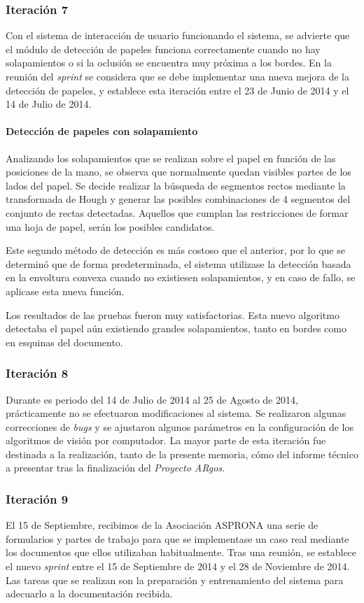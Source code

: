 \subsubsection{Iteración 7}
Con el sistema de interacción de usuario funcionando el sistema, se advierte que el módulo de detección de papeles funciona correctamente cuando no hay solapamientos o si la oclusión se encuentra muy próxima a los bordes. En la reunión del \textit{sprint} se considera que se debe implementar una nueva mejora de la detección de papeles, y establece esta iteración entre el 23 de Junio de 2014 y el 14 de Julio de 2014.

\paragraph{Detección de papeles con solapamiento}
Analizando los solapamientos que se realizan sobre el papel en función de las posiciones de la mano, se observa que normalmente quedan visibles partes de los lados del papel. Se decide realizar la búsqueda de segmentos rectos mediante la transformada de Hough y generar las posibles combinaciones de 4 segmentos del conjunto de rectas detectadas. Aquellos que cumplan las restricciones de formar una hoja de papel, serán los posibles candidatos.

Este segundo método de detección es más costoso que el anterior, por lo que se determinó que de forma predeterminada, el sistema utilizase la detección basada en la envoltura convexa cuando no existiesen solapamientos, y en caso de fallo, se aplicase esta nueva función. 

Los resultados de las pruebas fueron muy satisfactorias. Esta nuevo algoritmo detectaba el papel aún existiendo grandes solapamientos, tanto en bordes como en esquinas del documento.

\subsubsection{Iteración 8}
Durante es periodo del 14 de Julio de 2014 al 25 de Agosto de 2014, prácticamente no se efectuaron modificaciones al sistema. Se realizaron algunas correcciones de \textit{bugs} y se ajustaron algunos parámetros en la configuración de los algoritmos de visión por computador. La mayor parte de esta iteración fue destinada a la realización, tanto de la presente memoria, cómo del informe técnico a presentar tras la finalización del \textit{Proyecto ARgos}.

\subsubsection{Iteración 9}
El 15 de Septiembre, recibimos de la Asociación ASPRONA una serie de formularios y partes de trabajo para que se implementase un caso real mediante los documentos que ellos utilizaban habitualmente. Tras una reunión, se establece el nuevo \textit{sprint} entre el 15 de Septiembre de 2014 y el 28 de Noviembre de 2014. Las tareas que se realizan son la preparación y entrenamiento del sistema para adecuarlo a la documentación recibida.
 
